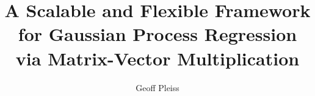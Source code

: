 \documentclass[phd,tocprelim,dvipsnames]{cornell}
\title{A Scalable and Flexible Framework for Gaussian Process Regression via Matrix-Vector Multiplication}
\author{Geoff Pleiss}
\begin{document}
\maketitle
\makecopyright


\begin{abstract}
  
\end{abstract}

\begin{biosketch}
  
\end{biosketch}

\begin{dedication}
  
\end{dedication}

\begin{acknowledgements}
  
\end{acknowledgements}

\contentspage
\tablelistpage
\figurelistpage
{}
\listofalgorithms
\newpage

\normalspacing \setcounter{page}{1} 
\pagestyle{cornell} \addtolength{\parskip}{0.5\baselineskip}









\appendix







\end{document}
